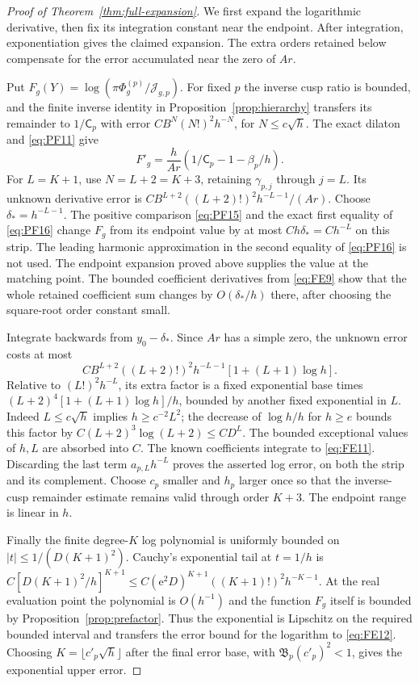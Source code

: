 \begin{proof}[Proof of Theorem~\ref{thm:full-expansion}]
We first expand the logarithmic derivative, then fix its integration
constant near the endpoint. After integration, exponentiation gives
the claimed expansion. The extra orders retained below compensate for
the error accumulated near the zero of $Ar$.

Put $F_g(Y)=\log(\pi\Phi_g^{(p)}/\mathcal J_{g,p})$.
For fixed $p$ the inverse cusp ratio is bounded, and the finite
inverse identity in Proposition~\ref{prop:hierarchy} transfers its
remainder to $1/\mathsf C_p$ with error
$CB^N(N!)^2h^{-N}$, for $N\le c\sqrt h$.
The exact dilaton and \eqref{eq:PF11} give
\[
 F'_g=\frac{h}{Ar}(1/\mathsf C_p-1-\beta_p/h).
\]
For $L=K+1$, use $N=L+2=K+3$, retaining $\gamma_{p,j}$ through
$j=L$. Its unknown derivative error is
$CB^{L+2}((L+2)!)^2h^{-L-1}/(Ar)$.
Choose $\delta_*=h^{-L-1}$.
The positive comparison \eqref{eq:PF15} and the exact first equality
of \eqref{eq:PF16} change $F_g$ from its endpoint value by at most
$Ch\delta_*=Ch^{-L}$ on this strip. The leading harmonic
approximation in the second equality of \eqref{eq:PF16} is not used.
The endpoint expansion proved above supplies the value at the matching point.
The bounded coefficient derivatives from \eqref{eq:FE9} show that the
whole retained coefficient sum changes by $O(\delta_*/h)$ there,
after choosing the square-root order constant small.

Integrate backwards from $y_0-\delta_*$. Since $Ar$ has a simple zero,
the unknown error costs at most
\[
 CB^{L+2}((L+2)!)^2h^{-L-1}[1+(L+1)\log h].
\]
Relative to $(L!)^2h^{-L}$, its extra factor is a fixed exponential
base times $(L+2)^4[1+(L+1)\log h]/h$, bounded by another fixed
exponential in $L$. Indeed $L\le c\sqrt h$ implies
$h\ge c^{-2}L^2$; the decrease of $\log h/h$ for $h\ge e$ bounds
this factor by $C(L+2)^3\log(L+2)\le C D^L$.
The bounded exceptional values of $h,L$ are absorbed into $C$.
The known coefficients integrate to
\eqref{eq:FE11}. Discarding the last term $a_{p,L}h^{-L}$ proves
the asserted log error, on both the strip and its complement.
Choose $c_p$ smaller and $h_p$ larger once so that the inverse-cusp
remainder estimate remains valid through order $K+3$. The endpoint range is linear in $h$.

Finally the finite degree-$K$ log polynomial is uniformly bounded on
$|t|\le1/(D(K+1)^2)$. Cauchy's exponential tail at $t=1/h$ is
$C[D(K+1)^2/h]^{K+1}\le C(\mathrm{e}^2D)^{K+1}((K+1)!)^2h^{-K-1}$.
At the real evaluation point the polynomial is $O(h^{-1})$ and the
function $F_g$ itself is bounded by Proposition~\ref{prop:prefactor}.
Thus the exponential is Lipschitz on the required bounded interval
and transfers the error bound for the logarithm to \eqref{eq:FE12}.
Choosing $K=\lfloor c'_p\sqrt h\rfloor$ after the final error base,
with $\mathfrak B_p(c'_p)^2<1$, gives the exponential upper error.
\end{proof}
